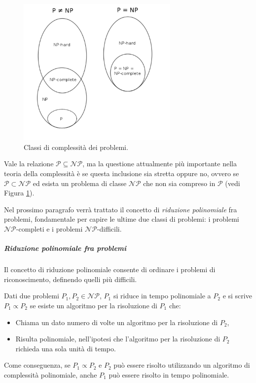 \begin{figure}[ht]
 \begin{center}
  \includegraphics[width=0.7\textwidth]{appendici/figure/ClassiComplessita.pdf}
  \caption{Classi di complessità dei problemi.}
  \label{fig:ClassiComplessita}
 \end{center}
\end{figure}


Vale la relazione $\mathcal{P} \subseteq \mathcal{NP}$, ma la questione attualmente più 
importante nella teoria della complessità è se questa inclusione sia stretta oppure 
no, ovvero se $\mathcal{P} \subset \mathcal{NP}$ ed esista un problema di classe 
$\mathcal{NP}$ che non sia compreso in $\mathcal{P}$ \cite{GasarchPoll} (vedi Figura 
\ref{fig:ClassiComplessita}).

Nel prossimo paragrafo verrà trattato il concetto di \emph{riduzione polinomiale} fra 
problemi, fondamentale per capire le ultime due classi di problemi: i problemi 
$\mathcal{NP}$-completi e i problemi $\mathcal{NP}$-difficili.

\subparagraph{Riduzione polinomiale fra problemi}
Il concetto di riduzione polinomiale consente di ordinare i problemi di riconoscimento, 
definendo quelli più difficili.

\begin{mydef}
 Dati due problemi $P_1, P_2 \in \mathcal{NP}$, $P_1$ si riduce in tempo polinomiale a 
$P_2$ e si scrive $P_1 \propto P_2$ se esiste un algoritmo per la risoluzione di $P_1$ 
che:
\begin{itemize}
 \item Chiama un dato numero di volte un algoritmo per la risoluzione di $P_2$,
 \item Risulta polinomiale, nell'ipotesi che l'algoritmo per la risoluzione di $P_2$ 
richieda una sola unità di tempo.
\end{itemize}
\end{mydef}
Come conseguenza, se $P_1 \propto P_2$ e $P_2$ può essere risolto utilizzando un 
algoritmo di complessità polinomiale, anche $P_1$ può essere risolto in tempo polinomiale.

